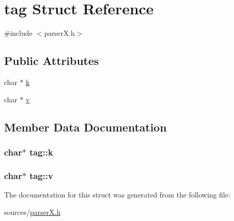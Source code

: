 \hypertarget{structtag}{\section{tag Struct Reference}
\label{structtag}
}


{\ttfamily \#include $<$parser\-X.\-h$>$}

\subsection*{Public Attributes}
\begin{DoxyCompactItemize}
\item 
char $\ast$ \hyperlink{structtag_a68b0058afb6c66ada4c90825c0febfe9}{k}
\item 
char $\ast$ \hyperlink{structtag_af825c0eeaf44e5d20e117edd17a3f4be}{v}
\end{DoxyCompactItemize}


\subsection{Member Data Documentation}
\hypertarget{structtag_a68b0058afb6c66ada4c90825c0febfe9}{
\subsubsection[{k}]{\setlength{\rightskip}{0pt plus 5cm}char$\ast$ tag\-::k}}\label{structtag_a68b0058afb6c66ada4c90825c0febfe9}
\hypertarget{structtag_af825c0eeaf44e5d20e117edd17a3f4be}{
\subsubsection[{v}]{\setlength{\rightskip}{0pt plus 5cm}char$\ast$ tag\-::v}}\label{structtag_af825c0eeaf44e5d20e117edd17a3f4be}


The documentation for this struct was generated from the following file\-:\begin{DoxyCompactItemize}
\item 
sources/\hyperlink{parser_x_8h}{parser\-X.\-h}\end{DoxyCompactItemize}
